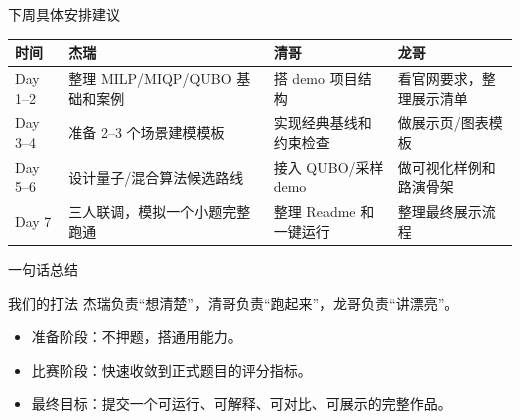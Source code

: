 \documentclass[aspectratio=169]{beamer}
\begin{document}
\begin{frame}{下周具体安排建议}
\small
\centering
\setlength{\tabcolsep}{3pt}
\begin{tabular}{p{1.6cm} p{3.0cm} p{3.0cm} p{3.0cm}}
\toprule
时间 & 杰瑞 & 清哥 & 龙哥 \\
\midrule
Day 1--2 & 整理 MILP/MIQP/QUBO 基础和案例 & 搭 demo 项目结构 & 看官网要求，整理展示清单 \\
Day 3--4 & 准备 2--3 个场景建模模板 & 实现经典基线和约束检查 & 做展示页/图表模板 \\
Day 5--6 & 设计量子/混合算法候选路线 & 接入 QUBO/采样 demo & 做可视化样例和路演骨架 \\
Day 7 & 三人联调，模拟一个小题完整跑通 & 整理 Readme 和一键运行 & 整理最终展示流程 \\
\bottomrule
\end{tabular}
\end{frame}

\begin{frame}{一句话总结}
\small
\begin{block}{我们的打法}
  杰瑞负责“想清楚”，清哥负责“跑起来”，龙哥负责“讲漂亮”。
\end{block}

\begin{itemize}
  \item 准备阶段：不押题，搭通用能力。
  \item 比赛阶段：快速收敛到正式题目的评分指标。
  \item 最终目标：提交一个可运行、可解释、可对比、可展示的完整作品。
\end{itemize}
\end{frame}
\end{document}
